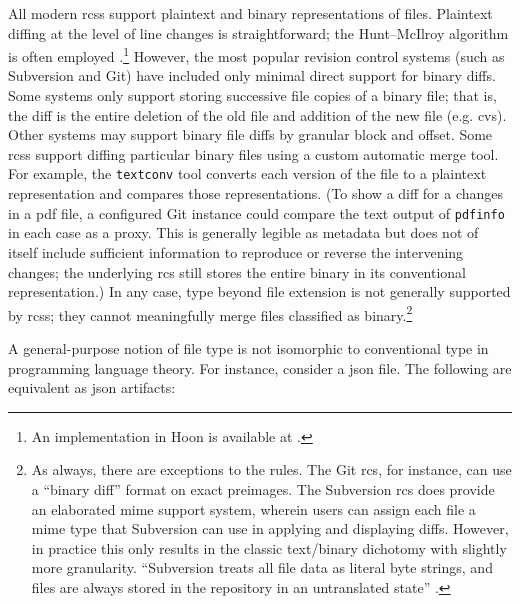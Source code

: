 \documentclass[twoside]{article}
\begin{document}
All modern {\sc rcs}s support plaintext and binary representations of files.  Plaintext diffing at the level of line changes is straightforward; the Hunt–McIlroy algorithm is often employed \citep{Hunt1976}.\footnote{An implementation in Hoon is available at .}  However, the most popular revision control systems (such as Subversion and Git) have included only minimal direct support for binary diffs.  Some systems only support storing successive file copies of a binary file; that is, the diff is the entire deletion of the old file and addition of the new file (e.g. {\sc cvs}).  Other systems may support binary file diffs by granular block and offset.  Some {\sc rcs}s support diffing particular binary files using a custom automatic merge tool.  For example, the \texttt{textconv} tool converts each version of the file to a plaintext representation and compares those representations.  (To show a diff for a changes in a {\sc pdf} file, a configured Git instance could compare the text output of \texttt{pdfinfo} in each case as a proxy.  This is generally legible as metadata but does not of itself include sufficient information to reproduce or reverse the intervening changes; the underlying {\sc rcs} still stores the entire binary in its conventional representation.)  In any case, type beyond file extension is not generally supported by {\sc rcs}s; they cannot meaningfully merge files classified as binary.\footnote{As always, there are exceptions to the rules.  The Git {\sc rcs}, for instance, can use a “binary diff” format on exact preimages.  The Subversion {\sc rcs} does provide an elaborated {\sc mime} support system, wherein users can assign each file a {\sc mime} type that Subversion can use in applying and displaying diffs.  However, in practice this only results in the classic text/binary dichotomy with slightly more granularity.  ``Subversion treats all file data as literal byte strings, and files are always stored in the repository in an untranslated state'' \citep{Collins2016}.
}


A general-purpose notion of file type is not isomorphic to conventional type in programming language theory.  For instance, consider a {\sc json} file.  The following are equivalent as {\sc json} artifacts:
\end{document}

